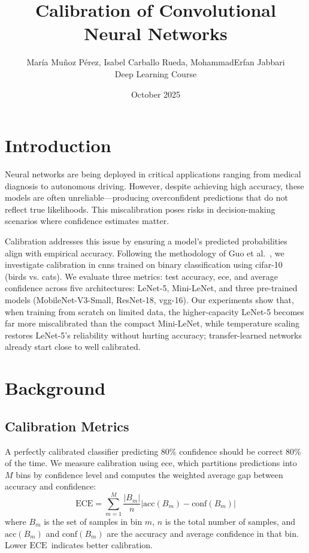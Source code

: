 \documentclass[10pt,twocolumn]{article}
\title{Calibration of Convolutional Neural Networks}
\author{María Muñoz Pérez, Isabel Carballo Rueda, MohammadErfan Jabbari \\ Deep Learning Course}
\date{October 2025}
\newcommand{\ece}{\ensuremath{\mathrm{ECE}}}
\begin{document}
\maketitle
\thispagestyle{fancy}

\section{Introduction}
\label{sec:intro}

Neural networks are being deployed in critical applications ranging from medical diagnosis to autonomous driving. However, despite achieving high accuracy, these models are often unreliable---producing overconfident predictions that do not reflect true likelihoods. This miscalibration poses risks in decision-making scenarios where confidence estimates matter.

Calibration addresses this issue by ensuring a model's predicted probabilities align with empirical accuracy. Following the methodology of Guo et al.~\cite{pmlr-v70-guo17a}, we investigate calibration in \glspl{cnn} trained on binary classification using \gls{cifar}-10~\cite{krizhevsky2009learning} (birds vs. cats). We evaluate three metrics: test accuracy, \gls{ece}, and average confidence across five architectures: LeNet-5, Mini-LeNet, and three pre-trained models (MobileNet-V3-Small, ResNet-18, \gls{vgg}-16). Our experiments show that, when training from scratch on limited data, the higher-capacity LeNet-5 becomes far more miscalibrated than the compact Mini-LeNet, while temperature scaling restores LeNet-5's reliability without hurting accuracy; transfer-learned networks already start close to well calibrated.

\section{Background}
\label{sec:background}

\subsection{Calibration Metrics}

A perfectly calibrated classifier predicting 80\% confidence should be correct 80\% of the time. We measure calibration using \gls{ece}, which partitions predictions into $M$ bins by confidence level and computes the weighted average gap between accuracy and confidence:
\begin{equation}
\ece = \sum_{m=1}^{M} \frac{|B_m|}{n} \left|\text{acc}(B_m) - \text{conf}(B_m)\right|
\end{equation}
where $B_m$ is the set of samples in bin $m$, $n$ is the total number of samples, and $\text{acc}(B_m)$ and $\text{conf}(B_m)$ are the accuracy and average confidence in that bin. Lower \ece~indicates better calibration.
\end{document}
